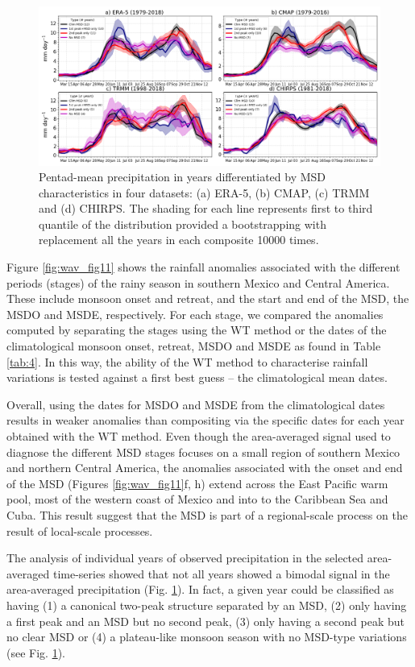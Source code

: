 \begin{figure}[t!]
 \noindent\includegraphics[width=\linewidth]{figures/wav_fig5c.png}
\caption[Seasonal cycle of precipitation for various MSD categories]{ Pentad-mean precipitation in years differentiated by MSD characteristics in four datasets: (a) ERA-5, (b) CMAP, (c) TRMM and (d) CHIRPS. The shading for each line represents first to third quantile of the distribution provided a bootstrapping with replacement all the years in each composite 10000 times.  }
\label{fig:S2}
\end{figure}

Figure \ref{fig:wav_fig11} shows the rainfall anomalies associated with the different periods (stages) of the rainy season in southern Mexico and Central America. These include monsoon onset and retreat, and the start and end of the MSD, the MSDO and MSDE, respectively. For each stage, we compared the anomalies computed by separating the stages using the WT method or the dates of the climatological monsoon onset, retreat, MSDO and MSDE as found in Table \ref{tab:4}. In this way, the ability of the WT method to characterise rainfall variations is tested against a first best guess -- the climatological mean dates. 

Overall, using the dates for MSDO and MSDE from the climatological dates results in weaker anomalies than compositing via the specific dates for each year obtained with the WT method.  Even though the area-averaged signal used to diagnose the different MSD stages focuses on a small region of southern Mexico and northern Central America, the anomalies associated with the onset and end of the MSD (Figures \ref{fig:wav_fig11}f, h) extend across the East Pacific warm pool, most of the western coast of Mexico and into to the Caribbean Sea and Cuba. This result suggest that the MSD is part of a regional-scale process on the result of local-scale processes. 

The analysis of individual years of observed precipitation in the selected area-averaged time-series showed that not all years showed a bimodal signal in the area-averaged precipitation (Fig. \ref{fig:S2}). In fact, a given year could be classified as having (1) a canonical two-peak structure separated by an MSD, (2) only having a first peak and an MSD but no second peak, (3) only having a second peak but no clear MSD or (4) a plateau-like monsoon season with no MSD-type variations (see Fig. \ref{fig:S2}). 


